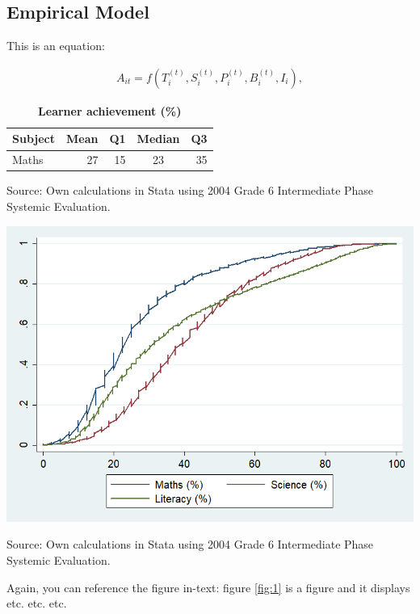 \documentclass[11pt,preprint, authoryear]{article}
\let\origfigure\figure
\let\endorigfigure\endfigure
\renewenvironment{figure}[1][2] {
    \expandafter\origfigure\expandafter[H]
} {
    \endorigfigure
}
\numberwithin{equation}{section}
\numberwithin{figure}{section}
\numberwithin{table}{section}
\begin{document}
\subsection{\texorpdfstring{Empirical Model
\label{Model}}{Empirical Model }}\label{empirical-model}

This is an equation:

\begin{align} \label{eq:EP1}
A_{it}=f(T_i^{(t)},S_i^{(t)},P_i^{(t)},B_i^{(t)},I_i),
\end{align}

\footnotesize
\renewcommand{\thetable}{\arabic{table}}

\begin{longtable} {@{} l r r c r @{}} \caption{\textbf{Learner achievement (\%)}}
\label{tab:Dep}\\ \hline \hline
Subject & Mean & Q1 & Median & Q3 \\
\hline
Maths&      27& 15&   23&  35\\ \hline \hline
\end{longtable}\begin{center} Source: Own calculations in Stata using 2004 Grade 6 Intermediate Phase Systemic Evaluation.\end{center}

\normalsize

\setcounter{figure}{0} \renewcommand{\thefigure}{\arabic{figure}}

\begin{figure}
\caption{\textbf{\footnotesize Cumulative graph for subject scores}}
\label{fig:1}

\begin{center}\includegraphics[width=0.4\linewidth]{./results/graphs/figure} \end{center}
\centering
{\footnotesize Source: Own calculations in Stata using 2004 Grade 6 Intermediate Phase Systemic Evaluation.}
\end{figure}

\normalsize

Again, you can reference the figure in-text: figure \ref{fig:1} is a
figure and it displays etc. etc. etc.
\end{document}
